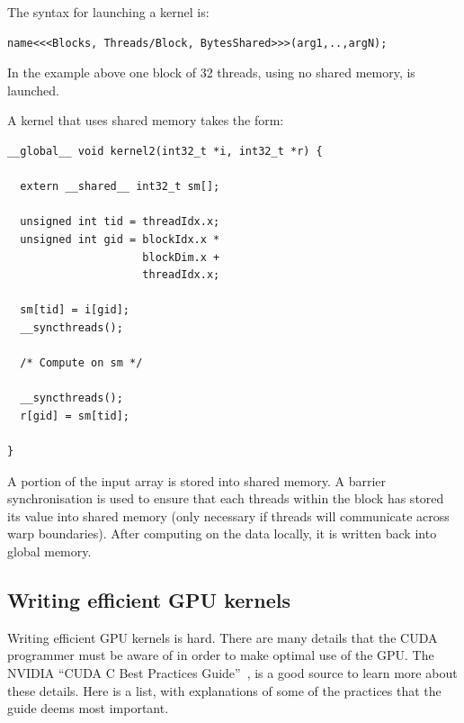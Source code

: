 \documentclass[a4paper]{book}
\begin{document}
\pagebreak 

The syntax for launching a kernel is:

\begin{small}
\begin{Verbatim}[samepage=true]
name<<<Blocks, Threads/Block, BytesShared>>>(arg1,..,argN);
\end{Verbatim}
\end{small}

\noindent In the example above one block of 32 threads, using no shared memory, is launched. 

A kernel that uses shared memory takes the form: 

\begin{small}
\begin{Verbatim}[samepage=true]
__global__ void kernel2(int32_t *i, int32_t *r) {

  extern __shared__ int32_t sm[]; 

  unsigned int tid = threadIdx.x; 
  unsigned int gid = blockIdx.x * 
                     blockDim.x + 
                     threadIdx.x;

  sm[tid] = i[gid]; 
  __syncthreads();

  /* Compute on sm */ 
     
  __syncthreads();
  r[gid] = sm[tid]; 
  
}
\end{Verbatim} 
\end{small} 

\noindent A portion of the input array is stored into shared memory. A 
barrier synchronisation is used to ensure that each threads within the block 
has stored its value into shared memory (only necessary if threads will 
communicate across warp boundaries). After computing on the data locally, 
it is written back into global memory. 


\subsection{Writing efficient GPU kernels} 
\label{sec:efficient}

Writing efficient GPU kernels is hard. There are many details that the CUDA 
programmer must be aware of in order to make optimal use of the GPU. 
The NVIDIA ``CUDA C Best Practices Guide''~\citet{BestPrac}, is a good source 
to learn more about these details. Here is a list, with explanations of some 
of the practices that the guide deems most important. 
\end{document}
